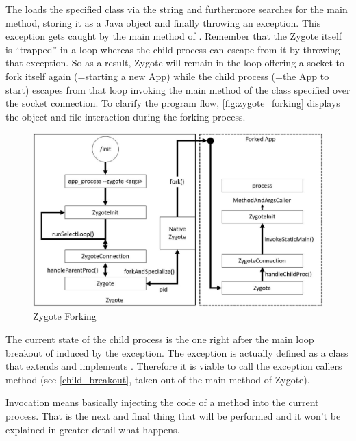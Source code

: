 The  loads the specified class via the  string and furthermore searches for the main method, storing it as a Java  object and finally throwing an
 exception. This exception gets caught by the main method of .
Remember that the Zygote itself is ``trapped'' in a loop whereas the child process can escape from it by throwing that exception. So as a result, Zygote will remain in the loop offering a socket to fork itself again (=starting a new App) while the child process (=the App to start) escapes from that loop invoking the main method of the class specified over the socket
connection.
To clarify the program flow, \autoref{fig:zygote_forking} displays
the object and file interaction during the forking process.

\begin{figure}[htb]
  \centering
  \includegraphics[width={\textwidth}]{figures/zygote_forking}
  \caption[Zygote Forking]{Zygote Forking}
  \label{fig:zygote_forking}
\end{figure}


The current state of the child process is the one right after the main loop breakout of  induced by the exception. The exception
is actually defined as a class that extends  and implements
. Therefore it is viable to call the exception callers
 method (see \autoref{child_breakout}, taken out of the main
method of Zygote).



Invocation means basically injecting the code of a method into the current process. That is the next and final thing that will be performed and it won't
be explained in greater detail what happens.

